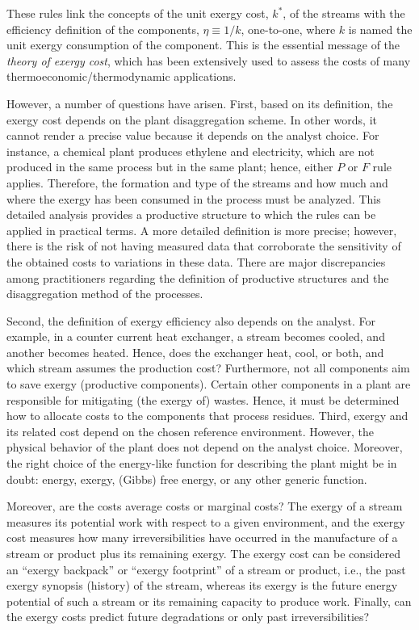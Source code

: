 \documentclass[energies,article,submit,moreauthors,pdftex]{Definitions/mdpi}
\begin{document}
These rules link  the concepts of the unit exergy cost, $k^*$, of the streams with the efficiency definition of the components, $\eta \equiv 1/k$, one-to-one, where $k$ is named the unit exergy consumption of the component. This is the essential message of the \emph{theory of exergy cost}, which has been extensively used to assess the costs of many thermoeconomic/thermodynamic applications.

However, a number of questions have arisen. First, based on its definition, the exergy cost depends on the plant disaggregation scheme. In other words, it cannot render a precise value because it depends on the analyst choice. For instance, a chemical plant produces ethylene and electricity, which are not produced in the same process but in the same plant; hence, either $P$ or $F$ rule applies. Therefore, the formation and type of the streams and how much and where the exergy has been consumed in the process must be analyzed. This detailed analysis provides a productive structure to which the rules can be applied in practical terms. A more detailed definition is more precise; however, there is the risk of not having measured data that corroborate the sensitivity of the obtained costs to variations in these data. There are major discrepancies among practitioners regarding the definition of productive structures and the disaggregation method of the processes.

Second, the definition of exergy efficiency also depends on the analyst. For example, in a counter current heat exchanger, a stream becomes cooled, and another becomes heated. Hence, does the exchanger heat, cool, or both, and which stream assumes the production cost? Furthermore, not all components aim to save exergy (productive components). Certain other components in a plant are responsible for mitigating (the exergy of) wastes. Hence, it must be determined how to allocate costs to the components that process residues.
Third, exergy and its related cost depend on the chosen reference environment. However, the physical behavior of the plant does not depend on the analyst choice. Moreover, the right choice of the energy-like function for describing the plant might be in doubt: energy, exergy, (Gibbs) free energy, or any other generic function. 

Moreover, are the costs average costs or marginal costs? The exergy of a stream measures its potential work with respect to a given environment, and the exergy cost measures how many irreversibilities have occurred in the manufacture of a stream or product plus its remaining exergy. The exergy cost can be considered an “exergy backpack” or “exergy footprint” of a stream or product, i.e., the past exergy synopsis (history) of the stream, whereas its exergy is the future energy potential of such a stream or its remaining capacity to produce work. Finally, can the exergy costs predict future degradations or only past irreversibilities?
\end{document}
